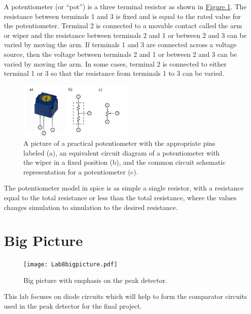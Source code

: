 A potentiometer (or ``pot'') is a three terminal resistor as shown in \hyperref[fig:potcktdia]{Figure \ref*{fig:potcktdia}}. The resistance between terminals 1 and 3 is fixed and is equal to the rated value for the potentiometer. Terminal 2 is connected to a movable contact called the arm or wiper and the resistance between terminals 2 and 1 or between 2 and 3 can be varied by moving the arm. If terminals 1 and 3 are connected across a voltage source, then the voltage between terminals 2 and 1 or between 2 and 3 can be varied by moving the arm. In some cases, terminal 2 is connected to either terminal 1 or 3 so that the resistance from terminals 1 to 3 can be varied. 

\begin{figure}[h] 
	\centering
	\includegraphics[width=0.5\textwidth]{lab6potdia.pdf}
	\caption{A picture of a practical potentiometer with the appropriate pins labeled (a), an equivalent circuit diagram of a potentiometer with the wiper in a fixed position (b), and the common circuit schematic representation for a potentiometer (c).} \label{fig:potcktdia}
\end{figure}

The potentiometer model in spice is as simple a single resistor, with a resistance equal to the total resistance or less than the total resistance, where the values changes simulation to simulation to the desired resistance. 

\section{Big Picture}

\begin{figure} [h]
	\centering
		\texttt{[image: Lab8bigpicture.pdf]}
	\caption{Big picture with emphasis on the peak detector.} \label{fig:8bp}
\end{figure}

This lab focuses on diode circuits which will help to form the comparator circuits used in the peak detector for the final project. 

